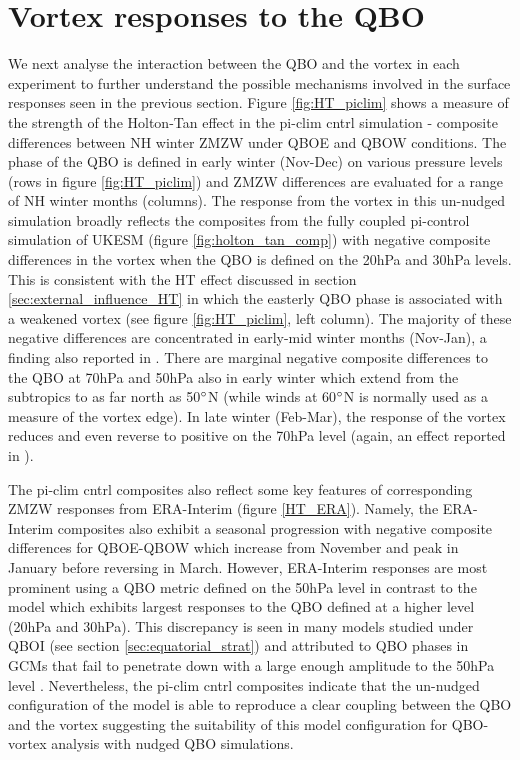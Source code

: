 \section{Vortex responses to the QBO}
\label{sec:vortex_responses_QBO}
We next analyse the interaction between the QBO and the vortex in each experiment to further understand the possible mechanisms involved in the surface responses seen in the previous section. Figure \ref{fig:HT_piclim} shows a measure of the strength of the Holton-Tan effect in the pi-clim cntrl simulation - composite differences between NH winter ZMZW under QBOE and QBOW conditions. The phase of the QBO is defined in early winter (Nov-Dec) on various pressure levels (rows in figure \ref{fig:HT_piclim}) and ZMZW differences are evaluated for a range of NH winter months (columns). The response from the vortex in this un-nudged simulation broadly reflects the composites from the fully coupled pi-control simulation of UKESM (figure \ref{fig:holton_tan_comp}) with negative composite differences in the vortex when the QBO is defined on the 20hPa and 30hPa levels. This is consistent with the HT effect discussed in section \ref{sec:external_influence_HT} in which the easterly QBO phase is associated with a weakened vortex (see figure \ref{fig:HT_piclim}, left column). The majority of these negative differences are concentrated in early-mid winter months (Nov-Jan), a finding also reported in \cite{graySurface2018b}. There are marginal negative composite differences to the QBO at 70hPa and 50hPa also in early winter which extend from the subtropics to as far north as 50$\degree$N (while winds at 60$\degree$N is normally used as a measure of the vortex edge). In late winter (Feb-Mar), the response of the vortex reduces and even reverse to positive on the 70hPa level (again, an effect reported in \cite{graySurface2018b}). 

The pi-clim cntrl composites also reflect some key features of corresponding ZMZW responses from ERA-Interim (figure \ref{HT_ERA}). Namely, the ERA-Interim composites also exhibit a seasonal progression with negative composite differences for QBOE-QBOW which increase from November and peak in January before reversing in March. However, ERA-Interim responses are most prominent using a QBO metric defined on the 50hPa level in contrast to the model which exhibits largest responses to the QBO defined at a higher level (20hPa and 30hPa). This discrepancy is seen in many models studied under QBOI (see section \ref{sec:equatorial_strat}) and attributed to QBO phases in GCMs that fail to penetrate down with a large enough amplitude to the 50hPa level \citep{ansteyTeleconnections2021}. Nevertheless, the pi-clim cntrl composites indicate that the un-nudged configuration of the model is able to reproduce a clear coupling between the QBO and the vortex suggesting the suitability of this model configuration for QBO-vortex analysis with nudged QBO simulations.

